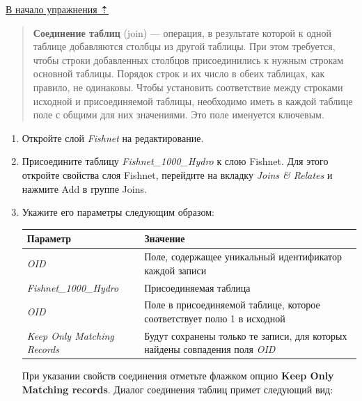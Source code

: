 \documentclass[]{book}
\theoremstyle{definition}
\theoremstyle{definition}
\theoremstyle{definition}
\theoremstyle{remark}
\begin{document}
\protect\hyperlink{land-cover-hydro}{В начало упражнения ⇡}

\begin{quote}
\textbf{Соединение таблиц} (join) --- операция, в результате которой к
одной таблице добавляются столбцы из другой таблицы. При этом требуется,
чтобы строки добавленных столбцов присоединились к нужным строкам
основной таблицы. Порядок строк и их число в обеих таблицах, как
правило, не одинаковы. Чтобы установить соответствие между строками
исходной и присоединяемой таблицы, необходимо иметь в каждой таблице
поле с общими для них значениями. Это поле именуется ключевым.
\end{quote}

\begin{enumerate}
\def\labelenumi{\arabic{enumi}.}
\item
  Откройте слой \emph{Fishnet} на редактирование.
\item
  Присоедините таблицу \emph{Fishnet\_1000\_Hydro} к слою Fishnet. Для
  этого откройте свойства слоя Fishnet, перейдите на вкладку \emph{Joins
  \& Relates} и нажмите Add в группе Joins.
\item
  Укажите его параметры следующим образом:

  \begin{longtable}[]{@{}ll@{}}
  \toprule
  Параметр & Значение\tabularnewline
  \midrule
  \endhead
  \emph{OID} & Поле, содержащее уникальный идентификатор каждой
  записи\tabularnewline
  \emph{Fishnet\_1000\_Hydro} & Присоединяемая таблица\tabularnewline
  \emph{OID} & Поле в присоединяемой таблице, которое соответствует полю
  1 в исходной\tabularnewline
  \emph{Keep Only Matching Records} & Будут сохранены только те записи,
  для которых найдены совпадения поля \emph{OID}\tabularnewline
  \bottomrule
  \end{longtable}

  При указании свойств соединения отметьте флажком опцию \textbf{Keep
  Only Matching records}. Диалог соединения таблиц примет следующий вид:


\end{enumerate}
\end{document}
